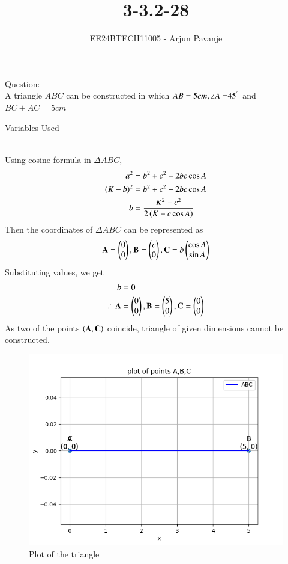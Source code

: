 \documentclass[journal]{IEEEtran}
\begin{document}

\vspace{3cm}

\title{3-3.2-28}
\author{EE24BTECH11005 - Arjun Pavanje}
{\let\newpage\relax\maketitle}
Question:\\
A triangle $ABC$ can be constructed in which $AB =5cm,\angle{A=}45^{\degree}$ and $BC+AC=5cm$
\begin{table}[h!]    
  \centering
  
  \caption{Variables Used}
  \label{tab1-1.9-6}
\end{table}\\
\solution
Using cosine formula in $\Delta ABC$,
\begin{align}
	a^2&=b^2+c^2-2bc\cos{A}\\
	\left(K-b\right)^2&=b^2+c^2-2bc\cos{A}\\
	b&=\frac{K^2-c^2}{2\left(K-c\cos{A}\right)}
\end{align}
Then the coordinates of $\Delta ABC$ can be represented as
\begin{align}
	\mathbf{A}=\begin{pmatrix}0\\0\end{pmatrix}, \mathbf{B}=\begin{pmatrix}c\\0\end{pmatrix}, \mathbf{C}=b\begin{pmatrix}\cos{A}\\\sin{A}\end{pmatrix}
\end{align}
Substituting values, we get
\begin{align}
	b&=0\\
	\therefore \mathbf{A}&=\begin{pmatrix}0\\0\end{pmatrix},\mathbf{B}=\begin{pmatrix}5\\0\end{pmatrix}, \mathbf{C}=\begin{pmatrix}0\\0\end{pmatrix}
\end{align}
As two of the points $\left(\mathbf{A},\mathbf{C}\right)$ coincide, triangle of given dimensions cannot be constructed.
\begin{figure}[h!]
   \centering
   \includegraphics[width = 1\linewidth]{figs/fig.png}
   \caption{Plot of the triangle}
   \label{stemplot}
\end{figure}
\end{document}
